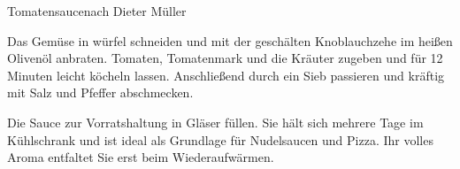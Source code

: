 \begin{recipe}{Tomatensauce}{nach Dieter Müller}
  \label{Tomatensauce}
  \inglist

  \steps
  Das Gemüse in würfel schneiden und mit der geschälten Knoblauchzehe im heißen
  Olivenöl anbraten. Tomaten, Tomatenmark und die Kräuter zugeben und für 12
  Minuten leicht köcheln lassen. Anschließend durch ein Sieb passieren und
  kräftig mit Salz und Pfeffer abschmecken.

  Die Sauce zur Vorratshaltung in Gläser füllen. Sie hält sich mehrere Tage im
  Kühlschrank und ist ideal als Grundlage für Nudelsaucen und Pizza. Ihr volles
  Aroma entfaltet Sie erst beim Wiederaufwärmen.

\end{recipe}

